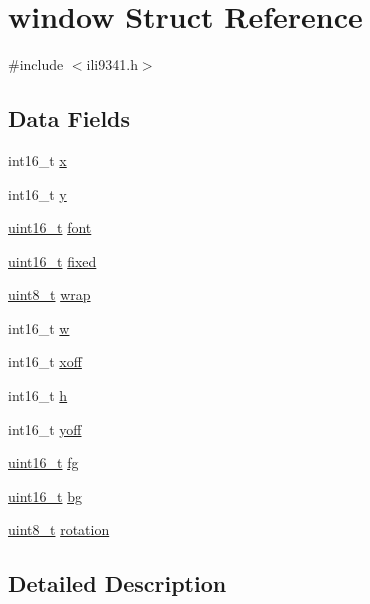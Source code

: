 \hypertarget{structwindow}{\section{window Struct Reference}
\label{structwindow}
}


{\ttfamily \#include $<$ili9341.\-h$>$}

\subsection*{Data Fields}
\begin{DoxyCompactItemize}
\item 
int16\-\_\-t \hyperlink{structwindow_a879b99940dfc34772f0257f54c67b817}{x}
\item 
int16\-\_\-t \hyperlink{structwindow_a95c7023fc42e79ab42c291b90a490776}{y}
\item 
\hyperlink{send_8c_a273cf69d639a59973b6019625df33e30}{uint16\-\_\-t} \hyperlink{structwindow_acee24e56db43557a46cbb5ca3fe35021}{font}
\item 
\hyperlink{send_8c_a273cf69d639a59973b6019625df33e30}{uint16\-\_\-t} \hyperlink{structwindow_a39a810713bcc5f9054a4a8a52d9efcc7}{fixed}
\item 
\hyperlink{send_8c_aba7bc1797add20fe3efdf37ced1182c5}{uint8\-\_\-t} \hyperlink{structwindow_aee853dc29d3cf708890faff063ce9afb}{wrap}
\item 
int16\-\_\-t \hyperlink{structwindow_ad89fdeb11ce94e2e7501f7290372d6ae}{w}
\item 
int16\-\_\-t \hyperlink{structwindow_a12d0408f393bc8d23cc3f1ce46c39879}{xoff}
\item 
int16\-\_\-t \hyperlink{structwindow_a822391abd5d09e6ce7152f68cff3ef2b}{h}
\item 
int16\-\_\-t \hyperlink{structwindow_a95c482caa25e4a283d962643d410bc29}{yoff}
\item 
\hyperlink{send_8c_a273cf69d639a59973b6019625df33e30}{uint16\-\_\-t} \hyperlink{structwindow_ac8739cdb3c50efcc1deaa5ab955a5e62}{fg}
\item 
\hyperlink{send_8c_a273cf69d639a59973b6019625df33e30}{uint16\-\_\-t} \hyperlink{structwindow_affcf5d29153103c2537542f5a4f8ba87}{bg}
\item 
\hyperlink{send_8c_aba7bc1797add20fe3efdf37ced1182c5}{uint8\-\_\-t} \hyperlink{structwindow_afbd48ebcb41e68d0f458dac593578aa8}{rotation}
\end{DoxyCompactItemize}


\subsection{Detailed Description}


